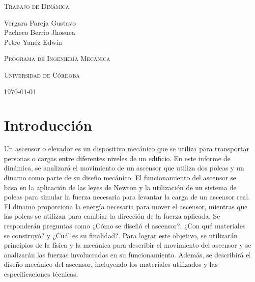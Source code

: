 \documentclass{article}
\begin{document}
\begin{titlepage}
\centering


\vspace{3cm}
{\scshape\Huge Trabajo de Dinámica \par}
\vspace{3cm}
\textbf\large\scshape{\par}
     \vspace{0.5cm}
     
{\Large Vergara Pareja Gustavo\\Pacheco Berrio Jhosuea\\Petro Yanéz Edwin\par}
\vspace{3cm}
{\scshape\Large Programa de Ingeniería Mecánica \par}
\vspace{2cm}
{\scshape\Large Universidad de Córdoba\par}
\vspace{1cm}
{\Large \today \par}
\end{titlepage}

\newpage
\tableofcontents
\newpage

\section*{Introducción}
Un ascensor o elevador es un dispositivo mecánico que se utiliza para transportar personas o 
cargas entre diferentes niveles de un edificio. En este informe de dinámica, se analizará el 
movimiento de un ascensor que utiliza dos poleas y un dinamo como parte de su diseño mecánico.
El funcionamiento del ascensor se basa en la aplicación de las leyes de Newton y la utilización
 de un sistema de poleas para simular la fuerza necesaria para levantar la carga de un ascensor real.
 \newline 
 El dinamo proporciona la energía necesaria para mover el ascensor, mientras que las poleas
  se utilizan para cambiar la dirección de la fuerza aplicada.
Se responderán preguntas 
como ¿Cómo se diseñó el ascensor?, ¿Con qué materiales se construyó? y ¿Cuál es su finalidad?.
\newline
Para lograr este objetivo, se utilizarán principios de la física y la mecánica para describir
 el movimiento del ascensor y se analizarán las fuerzas involucradas en su funcionamiento. 
 Además, se describirá el diseño mecánico del ascensor, incluyendo los materiales utilizados 
 y las especificaciones técnicas.
 \newpage
\end{document}
